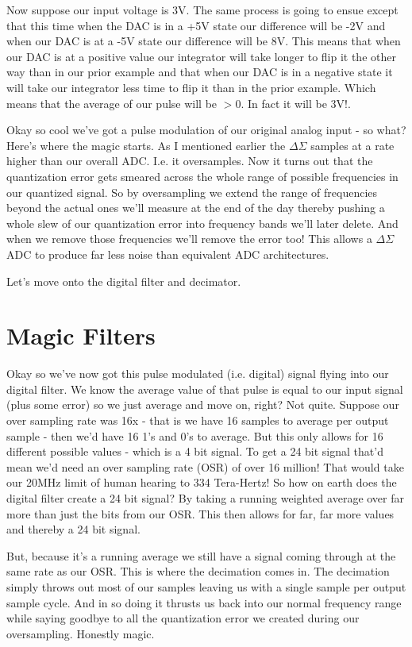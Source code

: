 \documentclass[12pt,a6paper]{book}
\begin{document}
Now suppose our input voltage is 3V. The same process is going to ensue except that this time when the DAC is in a +5V state our difference will be -2V and when our DAC is at a -5V state our difference will be 8V. This means that when our DAC is at a positive value our integrator will take longer to flip it the other way than in our prior example and that when our DAC is in a negative state it will take our integrator less time to flip it than in the prior example. Which means that the average of our pulse will be $>0$. In fact it will be 3V!. 

Okay so cool we've got a pulse modulation of our original analog input - so what? Here's where the magic starts. As I mentioned earlier the $\Delta \Sigma$ samples at a rate higher than our overall ADC. I.e. it oversamples. Now it turns out that the quantization error gets smeared across the whole range of possible frequencies in our quantized signal. So by oversampling we extend the range of frequencies beyond the actual ones we'll measure at the end of the day thereby pushing a whole slew of our quantization error into frequency bands we'll later delete. And when we remove those frequencies we'll remove the error too! This allows a $\Delta \Sigma$ ADC to produce far less noise than equivalent ADC architectures. 

Let's move onto the digital filter and decimator. 

\section{Magic Filters}
Okay so we've now got this pulse modulated (i.e. digital) signal flying into our digital filter. We know the average value of that pulse is equal to our input signal (plus some error) so we just average and move on, right? Not quite. Suppose our over sampling rate was 16x - that is we have 16 samples to average per output sample - then we'd have 16 1's and 0's to average. But this only allows for 16 different possible values - which is a 4 bit signal. To get a 24 bit signal that'd mean we'd need an over sampling rate (OSR) of over 16 million! That would take our 20MHz limit of human hearing to 334 Tera-Hertz! So how on earth does the digital filter create a 24 bit signal? By taking a running weighted average over far more than just the bits from our OSR. This then allows for far, far more values and thereby a 24 bit signal. 

But, because it's a running average we still have a signal coming through at the same rate as our OSR. This is where the decimation comes in. The decimation simply throws out most of our samples leaving us with a single sample per output sample cycle. And in so doing it thrusts us back into our normal frequency range while saying goodbye to all the quantization error we created during our oversampling. Honestly magic. 
\end{document}
